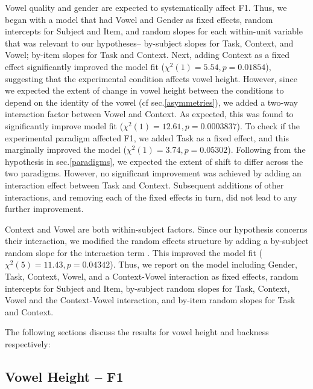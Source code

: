 \documentclass[charis,linguex]{glossa}
\begin{document}
Vowel quality and gender are expected to systematically affect F1. Thus, we began with a model that had Vowel and Gender as fixed effects, random intercepts for Subject and Item, and random slopes for each within-unit variable that was relevant to our hypotheses-- by-subject slopes for Task, Context, and Vowel; by-item slopes for Task and Context. Next, adding Context as a fixed effect significantly improved the model fit ($\chi^2(1) = 5.54, p= 0.01854$), suggesting that the experimental condition affects vowel height. However, since we expected the extent of change in vowel height between the conditions to depend on the identity of the vowel (cf sec.\ref{asymmetries}), we added a two-way interaction factor between Vowel and Context. As expected, this was found to significantly improve model fit ($\chi^2(1) = 12.61, p= 0.0003837$). To check if the experimental paradigm affected F1, we added Task as a fixed effect, and this marginally improved the model ($\chi^2(1) = 3.74, p= 0.05302$). Following from the hypothesis in sec.\ref{paradigms}, we expected the extent of shift to differ across the two paradigms. However, no significant improvement was achieved by adding an interaction effect between Task and Context. Subsequent additions of other interactions, and removing each of the fixed effects in turn, did not lead to any further improvement. 

Context and Vowel are both within-subject factors. Since our hypothesis concerns their interaction, we modified the random effects structure by adding a by-subject random slope for the interaction term \citep{brauer2018linear}. This improved the model fit ($\chi^2(5) = 11.43, p = 0.04342$). Thus, we report on the model including Gender, Task, Context, Vowel, and a Context-Vowel interaction as fixed effects, random intercepts for Subject and Item, by-subject random slopes for Task, Context, Vowel and the Context-Vowel interaction, and by-item random slopes for Task and Context.

The following sections discuss the results for vowel height and backness respectively:

\subsection{Vowel Height -- F1}
\end{document}
